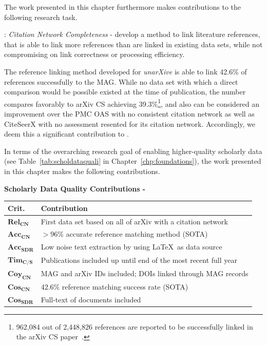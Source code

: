 The work presented in this chapter furthermore makes contributions to the following research task.

\begin{rtlist}
    \item[\rtmark{2}:] \textit{Citation Network Completeness} - develop a method to link literature references, that is able to link more references than are linked in existing data sets, while not compromising on link correctness or processing efficiency.
\end{rtlist}


The reference linking method developed for \emph{unarXive} is able to link 42.6\% of references successfully to the MAG. While no data set with which a direct comparison would be possible existed at the time of publication, the number compares favorably to arXiv CS achieving 39.3\%\footnote{962,084 out of 2,448,826 references are reported to be successfully linked in the arXiv CS paper~\cite{Faerber2018LREC}.}, and also can be considered an improvement over the PMC OAS with no consistent citation network as well as CiteSeerX with no assessment resented for its citation network. Accordingly, we deem this a significant contribution to .

In terms of the overarching research goal of enabling higher-quality scholarly data (see Table~\ref{tab:scholdataquali} in Chapter~\ref{chp:foundations}), the work presented in this chapter makes the following contributions.

\begin{infobox-progress}
      \textbf{Scholarly Data Quality Contributions - \cite{Saier2020}}\vspace{0.5em}

      \begin{tabular}{lp{10.9cm}}
        \toprule
        Crit. & Contribution \\
        \midrule
        $\mathbf{Rel_{CN}}$ & First data set based on all of arXiv with a citation network \\
        $\mathbf{Acc_{CN}}$ & $>96$\% accurate reference matching method (SOTA) \\
        $\mathbf{Acc_{SDR}}$ & Low noise text extraction by using \LaTeX\ as data source \\
        $\mathbf{Tim_{C/S}}$ & Publications included up until end of the most recent full year \\
        $\mathbf{Coy_{CN}}$ & MAG and arXiv IDs included; DOIs linked through MAG records \\
        $\mathbf{Cos_{CN}}$ & 42.6\% reference matching success rate (SOTA) \\
        $\mathbf{Cos_{SDR}}$ & Full-text of documents included \\
        \bottomrule
      \end{tabular}
\end{infobox-progress}

